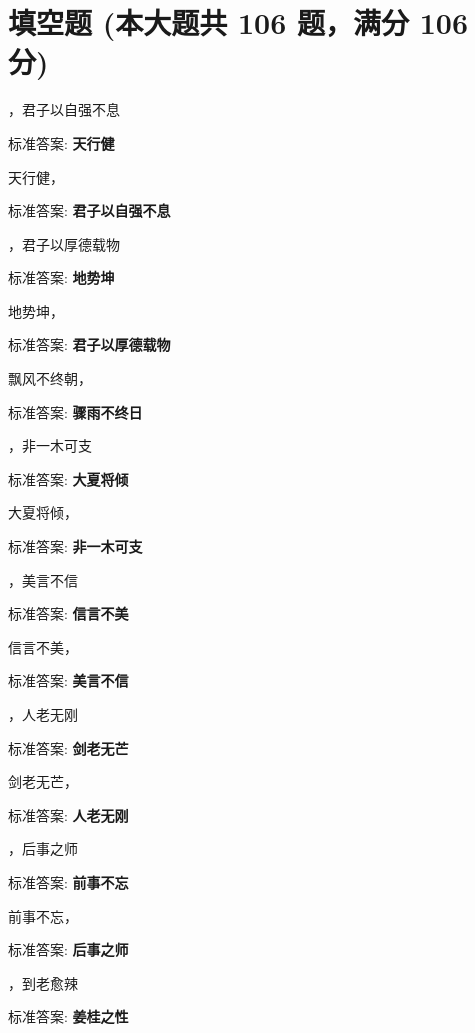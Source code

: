\documentclass[12pt, a4paper, addpoints]{exam}
\begin{document}
\section{\normalsize{填空题 (本大题共 106 题，满分 106 分)}}
\hspace{1.5cm}
\begin{multicols}{2}
\begin{questions}
\question[1] \uline{\qquad\qquad\qquad}，君子以自强不息

标准答案: \textbf{天行健}

\question[1] 天行健，\uline{\qquad\qquad\qquad}

标准答案: \textbf{君子以自强不息}

\question[1] \uline{\qquad\qquad\qquad}，君子以厚德载物

标准答案: \textbf{地势坤}

\question[1] 地势坤，\uline{\qquad\qquad\qquad}

标准答案: \textbf{君子以厚德载物}

\question[1] 飘风不终朝，\uline{\qquad\qquad\qquad}

标准答案: \textbf{骤雨不终日}

\question[1] \uline{\qquad\qquad\qquad}，非一木可支

标准答案: \textbf{大夏将倾}

\question[1] 大夏将倾，\uline{\qquad\qquad\qquad}

标准答案: \textbf{非一木可支}

\question[1] \uline{\qquad\qquad\qquad}，美言不信

标准答案: \textbf{信言不美}

\question[1] 信言不美，\uline{\qquad\qquad\qquad}

标准答案: \textbf{美言不信}

\question[1] \uline{\qquad\qquad\qquad}，人老无刚

标准答案: \textbf{剑老无芒}

\question[1] 剑老无芒，\uline{\qquad\qquad\qquad}

标准答案: \textbf{人老无刚}

\question[1] \uline{\qquad\qquad\qquad}，后事之师

标准答案: \textbf{前事不忘}

\question[1] 前事不忘，\uline{\qquad\qquad\qquad}

标准答案: \textbf{后事之师}

\question[1] \uline{\qquad\qquad\qquad}，到老愈辣

标准答案: \textbf{姜桂之性}


\end{questions}
\end{multicols}
\end{document}
